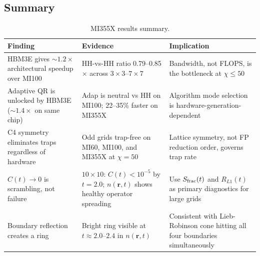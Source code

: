 \documentclass[11pt]{article}
\begin{document}
\subsection*{Summary}

\begin{table}[ht]
\centering
\caption{MI355X results summary.}
\label{tab:mi355x_summary}
\smallskip
\small
\begin{tabular}{p{3.8cm} p{4.0cm} p{4.4cm}}
\toprule
\textbf{Finding} & \textbf{Evidence} & \textbf{Implication} \\
\midrule
HBM3E gives ${\sim}1.2\times$ architectural speedup over MI100
  & HH-vs-HH ratio 0.79--0.85$\times$ across $3\times3$--$7\times7$
  & Bandwidth, not FLOPS, is the bottleneck at $\chi \leq 50$ \\[4pt]

Adaptive QR is unlocked by HBM3E (${\sim}1.4\times$ on same chip)
  & Adap is neutral vs HH on MI100; 22--35\% faster on MI355X
  & Algorithm mode selection is hardware-generation-dependent \\[4pt]

C4 symmetry eliminates traps regardless of hardware
  & Odd grids trap-free on MI60, MI100, and MI355X at $\chi=50$
  & Lattice symmetry, not FP reduction order, governs trap rate \\[4pt]

$C(t)\to 0$ is scrambling, not failure
  & $10\times10$: $C(t) < 10^{-5}$ by $t=2.0$; $n(\mathbf{r},t)$ shows
    healthy operator spreading
  & Use $S_{\rm frac}(t)$ and $R_{L1}(t)$ as primary diagnostics for large grids \\[4pt]

Boundary reflection creates a ring
  & Bright ring visible at $t \approx 2.0$--$2.4$ in $n(\mathbf{r},t)$
  & Consistent with Lieb-Robinson cone hitting all four boundaries simultaneously \\
\bottomrule
\end{tabular}
\end{table}
\fi
\end{document}
